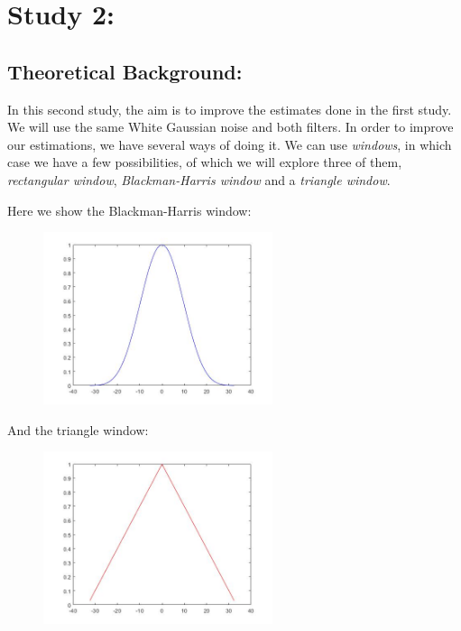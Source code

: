 \documentclass[a4paper,11pt]{article}
\begin{document}
\newpage

\section{Study 2:}

\subsection{Theoretical Background:}

In this second study, the aim is to improve the estimates done in the first study. We will use the same White Gaussian noise and both filters. In order to improve our estimations, we have several ways of doing it. We can use \textit{windows}, in which case we have a few possibilities, of which we will explore three of them, \textit{rectangular window}, \textit{Blackman-Harris window} and a \textit{triangle window}.

Here we show the Blackman-Harris window:

\begin{figure}[!hp]
    \begin{center}
    \includegraphics[width=0.6\textwidth]{images/lab2_figure11.jpg}
    \end{center}
\end{figure}

And the triangle window:

\begin{figure}[!hp]
    \begin{center}
    \includegraphics[width=0.6\textwidth]{images/lab2_figure13.jpg}
    \end{center}
\end{figure}
\end{document}

